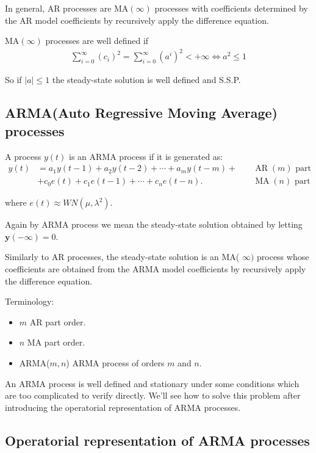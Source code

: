 In general, AR processes are $\mathrm{MA}(\infty)$ processes with coefficients determined by the AR model coefficients by recursively apply the difference equation.

$\mathrm{MA}(\infty)$ processes are well defined if 
\begin{align*}
	\sum_{i=0}^{\infty} \left(c_{i}\right)^2=\sum_{i=0}^{\infty} \left(a^{i}\right)^2< +\infty \iff a^2\leq 1
\end{align*}

So if $|a|\leq1$ the steady-state solution is well defined and S.S.P.

\subsection{ARMA(Auto Regressive Moving Average) processes}

A process $y(t)$ is an ARMA process if it is generated as:
\begin{align*}
	y(t)&=a_{1} y(t-1)+a_{2} y(t-2)+\cdots+a_{m} y(t-m)+\quad &\operatorname{AR}(m) \text{ part}\\ &+c_{0} e(t)+c_{1} e(t-1)+\cdots+c_{n} e(t-n) . \quad &\operatorname{MA}(n) \text{ part}
\end{align*}

where $e(t) \approx W N\left(\mu, \lambda^{2}\right)$.

Again by ARMA process we mean the steady-state solution obtained by letting $\mathbf{y}(-\infty)=0$.
 
Similarly to AR processes, the steady-state solution is an MA( $\infty)$ process whose coefficients are obtained from the ARMA model coefficients by recursively apply the difference equation.
 
Terminology:
\begin{itemize}
	\item $m$ AR part order.
	\item $n$ MA part order.
	\item ARMA($m,n$) ARMA process of orders $m$ and $n$.
\end{itemize}

An ARMA process is well defined and stationary under some conditions which are too complicated to verify directly.
We'll see how to solve this problem after introducing the operatorial 
representation of ARMA processes.

\subsection{Operatorial representation of ARMA processes}

